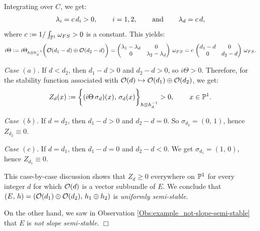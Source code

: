 \documentclass[12pt]{article}
\begin{document}
Integrating over $C$, we get: \begin{eqnarray*}\lambda_i = c\,d_i > 0, \hspace{5ex} i=1,2, \hspace{5ex}\mbox{and}\hspace{5ex} \lambda_d = c\,d,\end{eqnarray*} where $c:=1/\int_{\mathbb{P}^1}\omega_{FS}>0$ is a constant. This yields: \begin{eqnarray*}i\Theta:=i\Theta_{h\otimes h_d^{-1}}\bigg({\cal O}(d_1-d)\oplus{\cal O}(d_2-d)\bigg) = \begin{pmatrix}\lambda_1 - \lambda_d & 0 \\
           0 & \lambda_2 - \lambda_d\end{pmatrix}\,\omega_{FS} = c\,\begin{pmatrix}d_1 - d & 0 \\
           0 & d_2 - d\end{pmatrix}\,\omega_{FS}.\end{eqnarray*}


\vspace{1ex}

{\it Case $(a)$.} If $d<d_2$, then $d_1-d>0$ and $d_2-d>0$, so $i\Theta>0$. Therefore, for the stability function associated with ${\cal O}(d)\hookrightarrow{\cal O}(d_1)\oplus{\cal O}(d_2)$, we get: \begin{eqnarray*}Z_d(x):=\bigg\{(i\Theta\,\sigma_d)(x),\,\sigma_d(x)\bigg\}_{h\otimes h_d^{-1}}>0, \hspace{5ex} x\in\mathbb{P}^1.\end{eqnarray*}


\vspace{1ex}

{\it Case $(b)$.} If $d=d_2$, then $d_1-d>0$ and $d_2-d=0$. So $\sigma_{d_2} = (0,\,1)$, hence $Z_{d_2}\equiv 0$.

\vspace{1ex}

{\it Case $(c)$.} If $d=d_1$, then $d_1-d=0$ and $d_2-d<0$. We get $\sigma_{d_1} = (1,\,0)$, hence $Z_{d_1}\equiv 0$.

\vspace{1ex}

This case-by-case discussion shows that $Z_d\geq 0$ everywhere on $\mathbb{P}^1$ for every integer $d$ for which ${\cal O}(d)$ is a vector subbundle of $E$. We conclude that $(E,\,h) = ({\cal O}(d_1)\oplus{\cal O}(d_2),\,h_1\oplus h_2)$ is {\it uniformly semi-stable}.

On the other hand, we saw in Observation \ref{Obs:example_not-slope-semi-stable} that $E$ is {\it not slope semi-stable}.  \hfill $\Box$
\end{document}
